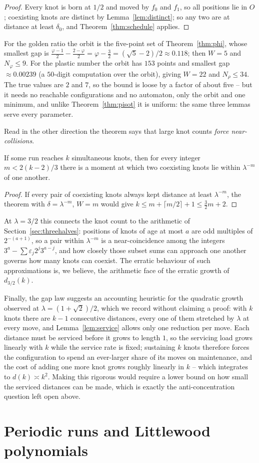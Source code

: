 \begin{proof}
Every knot is born at $1/2$ and moved by $f_0$ and $f_1$, so all positions lie
in $O$; coexisting knots are distinct by Lemma~\ref{lem:distinct}; so any two
are at distance at least $\delta_0$, and Theorem~\ref{thm:schedule} applies.
\end{proof}

For the golden ratio the orbit is the five-point set of
Theorem~\ref{thm:phi}, whose smallest gap is
$\frac{\varphi-1}{2}-\frac{2-\varphi}{2}=\varphi-\tfrac32=(\sqrt5-2)/2\approx
0.118$; then $W=5$ and $N_\varphi\leq9$. For the plastic number the orbit has
$153$ points and smallest gap $\approx0.00239$ (a $50$-digit computation over
the orbit), giving $W=22$ and $N_\rho\leq34$. The true values are $2$ and $7$,
so the bound is loose by a factor of about five -- but it needs no reachable
configurations and no automaton, only the orbit and one minimum, and unlike
Theorem~\ref{thm:pisot} it is uniform: the same three lemmas serve every
parameter.

Read in the other direction the theorem says that large knot counts
\emph{force near-collisions}.

\begin{corollary}\label{cor:nearcollision}
If some run reaches $k$ simultaneous knots, then for every integer
$m<2(k-2)/3$ there is a moment at which two coexisting knots lie within
$\lambda^{-m}$ of one another.
\end{corollary}

\begin{proof}
If every pair of coexisting knots always kept distance at least
$\lambda^{-m}$, the theorem with $\delta=\lambda^{-m}$, $W=m$ would give
$k\leq m+\lceil m/2\rceil+1\leq \tfrac32m+2$.
\end{proof}

At $\lambda=3/2$ this connects the knot count to the arithmetic of
Section~\ref{sec:threehalves}: positions of knots of age at most $a$ are odd
multiples of $2^{-(a+1)}$, so a pair within $\lambda^{-m}$ is a
near-coincidence among the integers $3^a-\sum\varepsilon_j2^j3^{a-j}$, and how
closely those subset sums can approach one another governs how many knots can
coexist. The erratic behaviour of such approximations is, we believe, the
arithmetic face of the erratic growth of $d_{3/2}(k)$.

Finally, the gap law suggests an accounting heuristic for the quadratic growth
observed at $\lambda=(1+\sqrt2)/2$, which we record without claiming a proof:
with $k$ knots there are $k-1$ consecutive distances, every one of them
stretched by $\lambda$ at every move, and Lemma~\ref{lem:service} allows only
one reduction per move. Each distance must be serviced before it grows to
length $1$, so the servicing load grows linearly with $k$ while the service
rate is fixed; sustaining $k$ knots therefore forces the configuration to
spend an ever-larger share of its moves on maintenance, and the cost of adding
one more knot grows roughly linearly in $k$ -- which integrates to
$d(k)\asymp k^2$. Making this rigorous would require a lower bound on how
small the serviced distances can be made, which is exactly the
anti-concentration question left open above.

\section{Periodic runs and Littlewood polynomials}\label{sec:kind}
